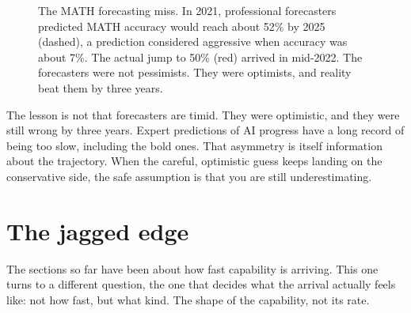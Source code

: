 \begin{figure}[h]
\centering
{}
\caption{The MATH forecasting miss. In 2021, professional forecasters predicted MATH accuracy would reach about 52\% by 2025 (dashed), a prediction considered aggressive when accuracy was about 7\%. The actual jump to 50\% (red) arrived in mid-2022. The forecasters were not pessimists. They were optimists, and reality beat them by three years.}
\label{fig:math-forecast}
\end{figure}

The lesson is not that forecasters are timid. They were optimistic, and they were still wrong by three years. Expert predictions of AI progress have a long record of being too slow, including the bold ones. That asymmetry is itself information about the trajectory. When the careful, optimistic guess keeps landing on the conservative side, the safe assumption is that you are still underestimating.

\section*{The jagged edge}

The sections so far have been about how fast capability is arriving. This one turns to a different question, the one that decides what the arrival actually feels like: not how fast, but what kind. The shape of the capability, not its rate.

